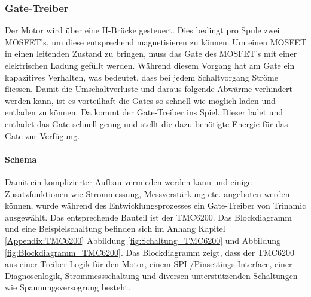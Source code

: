 \clearpage
\subsubsection{Gate-Treiber}
\label{subsubsec:Gate-Treiber}


Der Motor wird über eine H-Brücke gesteuert. Dies bedingt pro Spule zwei MOSFET's, um diese entsprechend magnetisieren zu können. Um einen MOSFET in einen leitenden Zustand zu bringen, muss das Gate des MOSFET's mit einer elektrischen Ladung gefüllt werden. Während diesem Vorgang hat am Gate ein kapazitives Verhalten, was bedeutet, dass bei jedem Schaltvorgang Ströme fliessen. Damit die Umschaltverluste und daraus folgende Abwärme verhindert werden kann, ist es vorteilhaft die Gates so schnell wie möglich laden und entladen zu können. Da kommt der Gate-Treiber ins Spiel. Dieser ladet und entladet das Gate schnell genug und stellt die dazu benötigte Energie für das Gate zur Verfügung.

\paragraph{Schema}\mbox{}

Damit ein komplizierter Aufbau vermieden werden kann und einige Zusatzfunktionen wie Strommessung, Messverstärkung etc. angeboten werden können, wurde während des Entwicklungsprozesses ein Gate-Treiber von Trinamic ausgewählt. Das entsprechende Bauteil ist der TMC6200. Das Blockdiagramm und eine Beispielschaltung befinden sich im Anhang Kapitel \ref{Appendix:TMC6200} Abbildung \ref{fig:Schaltung_TMC6200} und Abbildung \ref{fig:Blockdiagramm_TMC6200}. Das Blockdiagramm zeigt, dass der TMC6200 aus einer Treiber-Logik für den Motor, einem SPI-/Pinsettings-Interface, einer Diagnosenlogik, Strommessschaltung und diversen unterstützenden Schaltungen wie Spannungsversogrung besteht.

